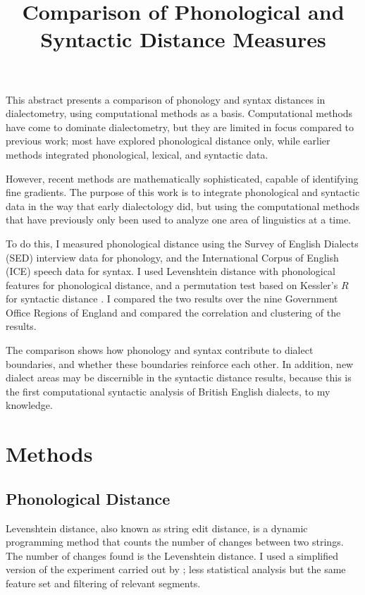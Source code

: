 \documentclass[11pt]{article}
\begin{document}
\title{Comparison of Phonological and Syntactic Distance Measures}

\maketitle

This abstract presents a comparison of phonology and syntax distances
in dialectometry, using computational methods as a
basis. Computational methods have come to dominate dialectometry, but
they are limited in focus compared to previous work; most have
explored phonological distance only, while earlier methods integrated
phonological, lexical, and syntactic data.

However, recent methods are mathematically sophisticated, capable of
identifying fine gradients. The purpose of this work is to integrate
phonological and syntactic data in the way that early dialectology
did, but using the computational methods that have previously only
been used to analyze one area of linguistics at a time.

To do this, I measured phonological distance using the Survey of
English Dialects (SED) \cite{orton63} interview data for phonology,
and the International Corpus of English (ICE) \cite{nelson02} speech
data for syntax. I used Levenshtein distance \cite{lev65} with
phonological features \cite{nerbonne97} for phonological distance, and
a permutation test based on Kessler's $R$ \cite{kessler01} for
syntactic distance \cite{nerbonne06}. I compared the two results over
the nine Government Office Regions of England and compared the
correlation and clustering of the results.

The comparison shows how phonology and syntax contribute to dialect
boundaries, and whether these boundaries reinforce each other. In
addition, new dialect areas may be discernible in the syntactic
distance results, because this is the first computational syntactic
analysis of British English dialects, to my knowledge.

\section{Methods}
\subsection{Phonological Distance}
Levenshtein distance, also known as string edit distance, is a dynamic
programming method that counts the number of changes between two
strings. The number of changes found is the Levenshtein distance. I
used a simplified version of the experiment carried out by
; less statistical analysis but the same feature
set and filtering of relevant segments.
\end{document}
